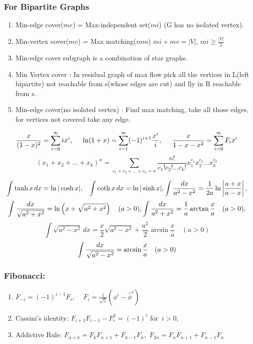 \documentclass[12pt]{extarticle}
\begin{document}
\begin{multicols*}{2}
		\subsubsection*{For Bipartite Graphs}
		\begin{enumerate}
			\itemsep0em 
			\item Min-edge cover($me$) = Max-independent set($mi$) (G has no isolated vertex).
			\item Min-vertex cover($mv$) = Max matching($mm$) \hspace{5mm} $mi + mv = |V|$,\hspace{5mm} $mi \geq \frac{|V|}{2}$
			\item Min-edge cover subgraph is a combination of star graphs.
			\item Min Vertex cover : In residual graph of max flow pick all the vertices in 
			L(left bipartite) not reachable from s(whose edges are cut) and lly in R reachable from s.
			\item Min-edge cover(no isolated vertex) : Find max matching, take all those edges, for vertices not covered
			take any edge.
		\end{enumerate}
		
		
			\vfill
			$$ {x \over (1 - x)^2} = \sum_{i=0}^\infty i x^i, \hspace{5mm}
			\ln (1 + x) = \sum_{i=1}^\infty (-1)^{i+1} {x^i \over i}, \hspace{5mm} {x \over 1 - x - x^2} = \sum_{i=0}^\infty F_i x^i$$
			$$(x_1 + x_2 + ... + x_k)^n = \sum_{c_1 + c_2 + ... + c_k = n}
			\frac{n!}{c_1! c_2! ... c_k!} x_1^{c_1} x_2^{c_2} ... x_k^{c_k}$$
	
	$$\int \tanh x \, dx = \ln \vert \cosh x \vert, \hspace{3mm}
	\int \coth x \, dx = \ln \vert \sinh x \vert, \int {dx  \over a^2 - x^2} = {1 \over 2a} \ln\left\vert{a + x \over a - x}\right\vert, $$
	$$ \int {dx  \over \sqrt{a^2 + x^2}}= \ln \left(x + \sqrt{a^2 + x^2}\right) \quad (a > 0), \int {dx  \over a^2 + x^2}= \frac 1 a \arctan \frac x a \quad (a > 0), $$
	$$ \int \sqrt{a^2 - x^2} \, dx = \frac x 2 \sqrt{a^2 - x^2} + \frac{a^2}{2} \arcsin \frac x a \quad (a > 0) $$ $$\int {dx  \over \sqrt{a^2 - x^2}} = \arcsin \frac x a \quad (a > 0) $$
	
		\subsubsection*{Fibonacci:}
	\begin{enumerate}
		\itemsep0em 
		\item $F_{-i} = (-1)^{i-1} F_i$,  $ \quad F_i = \frac{1}{\sqrt{5}} \left(\phi^i - \hat{\phi}^i\right)$
		\item Cassini's identity: $F_{i+1} F_{i-1} - F^2_i = (-1)^i$ \quad \hbox{for $i > 0$,}
		\item Addictive Rule:
		\hspace{2mm}
		$F_{n+k} = F_k F_{n+1} + F_{k-1} F_n,$ \hspace{2mm}
		$F_{2n} = F_n F_{n+1} + F_{n-1} F_n$
		

\end{enumerate}
\end{multicols*}
\end{document}
